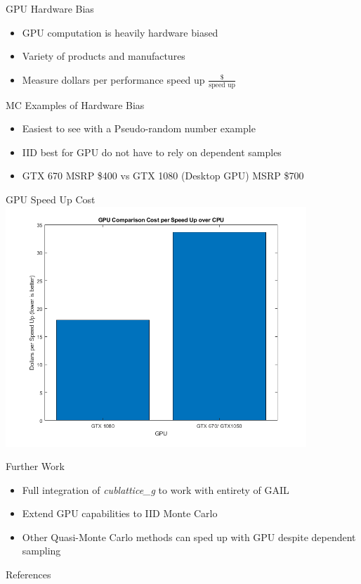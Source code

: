 \documentclass[11pt]{beamer}
\begin{document}
\begin{frame}{GPU Hardware Bias}
\begin{itemize}
\item GPU computation is heavily hardware biased
\item Variety of products and manufactures
\item Measure dollars per performance speed up $\frac{\$}{\text{speed up}}$
\end{itemize}
\end{frame}

\begin{frame}{MC Examples of Hardware Bias}%
\begin{itemize}
\item Easiest to see with a Pseudo-random number example
\item IID best for GPU do not have to rely on dependent samples
\item GTX 670 MSRP \$400 vs GTX 1080 (Desktop GPU) MSRP \$700
\end{itemize}
\end{frame}

\begin{frame}{GPU Speed Up Cost}
\centering
\includegraphics[width=0.85\textwidth]{gpuspeedup.png} 
\end{frame}

\begin{frame}{Further Work}
\begin{itemize}
\item Full integration of \textit{cublattice\_g} to work with entirety of GAIL
\item Extend GPU capabilities to IID Monte Carlo 
\item Other Quasi-Monte Carlo methods can sped up with GPU despite dependent sampling
\end{itemize}
\end{frame}

\begin{frame}{References}


\end{frame}
\end{document}
